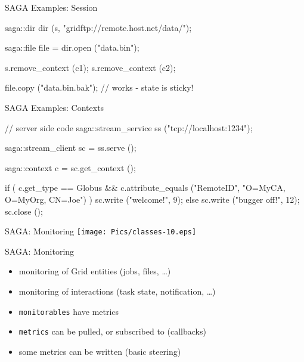 \documentclass[%
  pdf,
  colorBG,
  slideColor,
  frames,
  ogf
]{prosper}
\newcommand{\T}[1]{\texttt{#1}}
\newcommand{\dn}{\vspace*{+1em}}
\begin{document}

 \begin{slide}{SAGA Examples: Session}

  \begin{mycode}[label=session inheritance]

  saga::dir  dir (s, "gridftp://remote.host.net/data/");

  saga::file file = dir.open ("data.bin");

  s.remove_context (c1);
  s.remove_context (c2);

  file.copy ("data.bin.bak");   // works - state is sticky!

  \end{mycode}
   
 \end{slide}


 \begin{slide}{SAGA Examples: Contexts}

  \begin{mycode}[label=authorization]
  // server side code
  saga::stream_service ss ("tcp://localhost:1234");

  saga::stream_client sc = ss.serve ();

  saga::context c = sc.get_context ();

  if ( c.get_type == Globus && 
       c.attribute_equals ("RemoteID", "O=MyCA, O=MyOrg, CN=Joe") )
  {
    sc.write ("welcome!", 9);
  }
  else
  {
    sc.write ("bugger off!", 12);
    sc.close ();
  }
  \end{mycode}
   
 \end{slide}


 \begin{slide}{SAGA: Monitoring}
   \texttt{[image: Pics/classes-10.eps]}
 \end{slide}


 \begin{slide}{SAGA: Monitoring}

 \dn 

  \begin{itemize}
   \item monitoring of Grid entities (jobs, files, \dots)
   \item monitoring of interactions (task state, notification, \dots)
   \item \T{monitorables} have metrics
   \item \T{metrics} can be pulled, or subscribed to (callbacks)
   \item some metrics can be written (basic steering)
  \end{itemize}

 \end{slide}
\end{document}
